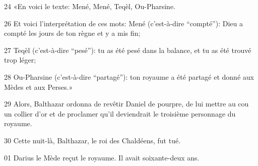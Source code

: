 24 «En voici le texte: Mené, Mené, Teqèl, Ou-Pharsine.

26 Et voici l’interprétation de ces mots: Mené (c’est-à-dire “compté”): Dieu a compté les jours de ton règne et y a mis fin;

27 Teqèl (c’est-à-dire “pesé”): tu as été pesé dans la balance, et tu as été trouvé trop léger;

28 Ou-Pharsine (c’est-à-dire “partagé”): ton royaume a été partagé et donné aux Mèdes et aux Perses.»

29 Alors, Balthazar ordonna de revêtir Daniel de pourpre, de lui mettre au cou un collier d’or et de proclamer qu’il deviendrait le troisième personnage du royaume.

30 Cette nuit-là, Balthazar, le roi des Chaldéens, fut tué.

01 Darius le Mède reçut le royaume. Il avait soixante-deux ans.


